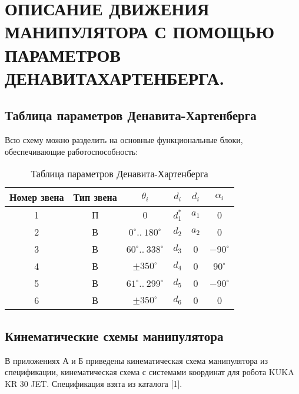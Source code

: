 \chapter{\MakeUppercase{Описание движения манипулятора с помощью параметров ДенавитаХартенберга. }}
\section{Таблица параметров Денавита-Хартенберга}
Всю схему можно разделить на основные функциональные блоки, обеспечивающие работоспособность:

\begin{table}[ht]
    \caption{Таблица параметров Денавита-Хартенберга}
    \label{table_dh}
    \centering
    \begin{tabular}{|c|c|c|c|c|c|}
    \hline Номер звена & Тип звена & $ \theta_i $ & $ d_i $ & $ d_i $ & $ \alpha_i $ \\
    \hline 1 & П & 0                            & $ d_{1}^{*} $ & $ a_1 $ & 0  \\
    \hline 2 & В & $ 0^\circ ..\: 180^\circ $   & $ d_2 $ & $ a_2 $ & 0 \\
    \hline 3 & В & $ 60^\circ ..\: 338^\circ $  & $ d_3 $ & 0 & $ -90^\circ $ \\
    \hline 4 & В & $ \pm 350^\circ $            & $ d_4 $ & 0 & $ 90^\circ $ \\
    \hline 5 & В & $ 61^\circ ..\: 299^\circ $  & $ d_5 $ & 0 & $ -90^\circ $ \\
    \hline 6 & В & $ \pm 350^\circ $            & $ d_6 $ & 0 & 0 \\
    \hline
    \end{tabular}
\end{table}

\section{Кинематические схемы манипулятора}

В приложениях А и Б приведены кинематическая схема манипулятора из спецификации, кинематическая схема с системами координат для робота KUKA KR 30 JET. Спецификация взята из каталога [1]. %

